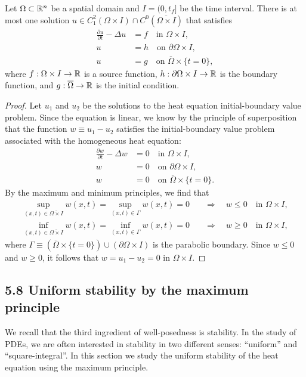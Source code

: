 \begin{theorem}
    Let $\Omega \subset \mathbb{R}^n$ be a spatial domain and $I = (0, t_f]$ be the time interval. There is at most one solution $u \in C_1^2(\Omega \times I) \cap C^0(\overline{\Omega \times I})$ that satisfies
    \begin{align*}
        \frac{\partial u}{\partial t} - \Delta u &= f \quad \text{in } \Omega \times I, \\
        u &= h \quad \text{on } \partial\Omega \times I, \\
        u &= g \quad \text{on } \overline{\Omega} \times \{t = 0\},
    \end{align*}
    where $f : \Omega \times I \to \mathbb{R}$ is a source function, $h : \partial\Omega \times I \to \mathbb{R}$ is the boundary function, and $g : \overline{\Omega} \to \mathbb{R}$ is the initial condition.
\end{theorem}
\begin{proof}
    Let $u_1$ and $u_2$ be the solutions to the heat equation initial-boundary value problem. Since the equation is linear, we know by the principle of superposition that the function $w \equiv u_1 - u_2$ satisfies the initial-boundary value problem associated with the homogeneous heat equation:
    \begin{align*}
        \frac{\partial w}{\partial t} - \Delta w &= 0 \quad \text{in } \Omega \times I, \\
        w &= 0 \quad \text{on } \partial\Omega \times I, \\
        w &= 0 \quad \text{on } \overline{\Omega} \times \{t = 0\}.
    \end{align*}
    By the maximum and minimum principles, we find that
    \begin{align*}
        \sup_{(x,t) \in \overline{\Omega \times I}} w(x, t) = \sup_{(x,t) \in \Gamma} w(x, t) = 0 \quad &\Rightarrow \quad w \leq 0 \quad \text{in } \Omega \times I, \\
        \inf_{(x,t) \in \overline{\Omega \times I}} w(x, t) = \inf_{(x,t) \in \Gamma} w(x, t) = 0 \quad &\Rightarrow \quad w \geq 0 \quad \text{in } \Omega \times I,
    \end{align*}
    where $\Gamma \equiv (\overline{\Omega} \times \{t = 0\}) \cup (\partial\Omega \times I)$ is the parabolic boundary. Since $w \leq 0$ and $w \geq 0$, it follows that $w = u_1 - u_2 = 0$ in $\Omega \times I$.
\end{proof}

\subsection{5.8 Uniform stability by the maximum principle}
We recall that the third ingredient of well-posedness is stability. In the study of PDEs, we are often interested in stability in two different senses: ``uniform'' and ``square-integral''. In this section we study the uniform stability of the heat equation using the maximum principle.

